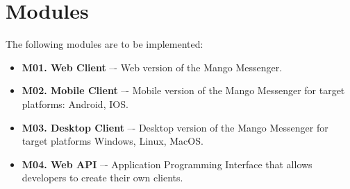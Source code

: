 \section{Modules}\label{sec:modules}
The following modules are to be implemented:
\begin{itemize}
    \item \textbf{M01. Web Client} –- Web version of the Mango Messenger.
    \item \textbf{M02. Mobile Client} –- Mobile version of the Mango Messenger for target platforms: Android, IOS\@.
    \item \textbf{M03. Desktop Client} –- Desktop version of the Mango Messenger for target platforms Windows, Linux, MacOS\@.
    \item \textbf{M04. Web API} –- Application Programming Interface that allows developers to create their own clients.
\end{itemize}